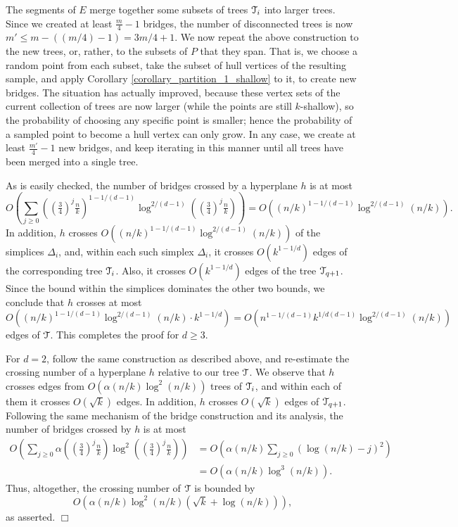 \documentclass[11pt]{article}
\newcommand{\Tree}{\EuScript{T}}
\begin{document}
The segments of $E$ merge together some subsets of trees $\Tree_{i}$ into larger trees. Since we created at least $\frac{m}{4} - 1$ bridges, the number of disconnected trees is now $m' \leq m - ((m/4) - 1) = 3m/4 + 1$. We now repeat the above construction to the new trees, or, rather, to the subsets of $P$ that they span. That is, we choose a random point from each subset, take the subset of hull vertices of the resulting sample, and apply Corollary \ref{corollary_partition_1_shallow} to it, to create new bridges. The situation has actually improved, because these vertex sets of the current collection of trees are now larger (while the points are still $k$-shallow), so the probability of choosing any specific point is smaller; hence the probability of a sampled point to become a hull vertex can only grow. In any case, we create at least $\frac{m'}{4} - 1$ new bridges, and keep iterating in this manner until all trees have been merged into a single tree.


As is easily checked, the number of bridges crossed by a hyperplane $h$ is at most
$$
O\left(\sum_{j \geq 0} \left(\left(\tfrac{3}{4}\right)^{j} \tfrac{n}{k} \right)^{1-1/(d-1)} \log^{2/(d-1)} \left(\left(\tfrac{3}{4} \right)^{j} \tfrac{n}{k} \right)\right)
= O\left((n/k)^{1-1/(d-1)} \log^{2/(d-1)}(n/k)\right).
$$
In addition, $h$ crosses $O\left((n/k)^{1-1/(d-1)} \log^{2/(d-1)}(n/k)\right)$ of the simplices $\Delta_{i}$, and, within each such simplex $\Delta_{i}$, it crosses $O(k^{1-1/d})$ edges of the corresponding tree $\Tree_{i}$. Also, it crosses $O(k^{1-1/d})$ edges of the tree $\Tree_{q+1}$. Since the bound within the simplices dominates the other two bounds, we conclude that $h$ crosses at most
$$
O\left((n/k)^{1-1/(d-1)} \log^{2/(d-1)}(n/k) \cdot k^{1-1/d}\right) = O\left(n^{1-1/(d-1)} k^{1/d(d-1)} \log^{2/(d-1)}(n/k)\right)
$$
edges of $\Tree$. This completes the proof for $d \geq 3$.

For $d = 2$, follow the same construction as described above, and re-estimate the crossing number of a hyperplane $h$ relative to our tree $\Tree$. We observe that $h$ crosses edges from $O\left(\alpha(n/k) \log^{2}(n/k)\right)$ trees of $\Tree_{i}$, and within each of them it crosses $O(\sqrt{k})$ edges. In addition, $h$ crosses $O(\sqrt{k})$ edges of $\Tree_{q+1}$. Following the same mechanism of the bridge construction and its analysis, the number of bridges crossed by $h$ is at most
\begin{align*}
O\left(\sum_{j \geq 0}\alpha \left(\left(\tfrac{3}{4}\right)^{j} \tfrac{n}{k} \right)
\log^{2}\left(\left(\tfrac{3}{4}\right)^{j}\tfrac{n}{k}\right) \right)
& = O\left(\alpha(n/k) \sum_{j \geq 0}\left(\log(n/k) - j \right)^{2}\right) \\
& = O\left(\alpha(n/k) \log^{3}(n/k) \right).
\end{align*}
Thus, altogether, the crossing number of $\Tree$ is bounded by
$$
O\left(\alpha(n/k) \log^{2}(n/k) (\sqrt{k} + \log(n/k))\right),
$$
as asserted. $\Box$
\end{document}
